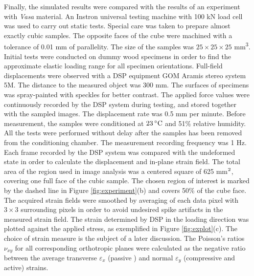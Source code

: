 \documentclass[3p]{elsarticle}
\begin{document}
Finally, the simulated results were compared with the results of an experiment
with \textit{Vasa} material.
An Instron universal testing machine with 100 kN load cell was used to carry out static tests. 
Special care was taken to prepare almost exactly cubic samples. The opposite faces of the cube were machined with a tolerance of 0.01 mm  of parallelity. 
The size of the samples was  $25\times25\times25$ mm\textsuperscript{3}.  
Initial tests were conducted on dummy wood specimens in order to find the approximate elastic loading range for all specimen orientations.
Full-field displacements were observed with a DSP equipment GOM Aramis stereo system 5M.
The distance to the measured object was 300 mm. The surfaces of specimens was spray-painted with speckles for better contrast. The applied force values were continuously recorded by the DSP system during testing, and stored together with the sampled images. The displacement rate was 0.5 mm per minute. 
Before measurement, the samples were conditioned at $23\,^{\circ}{\rm C}$ and 51\% relative humidity.
All the tests were performed without delay after the samples has been  removed from the conditioning chamber. The measurement recording frequency was 1 Hz. 
Each frame recorded by the DSP system was compared with the undeformed state in order to calculate the displacement and in-plane strain field. 
The total area of the region used in image analysis was a centered square
of 625 mm$\textsuperscript{2}$, covering one full face of the cubic sample.
The chosen region of interest is marked by the dashed line in Figure
\ref{fig:experiment}(b) and covers 50\% of the cube face. The acquired
strain fields were smoothed by averaging of each data pixel with $3\times3$ surrounding pixels in order to avoid 
undesired spike artifacts in the measured strain field.
The strain determined by DSP in the loading direction was plotted against the
applied stress, as exemplified in Figure \ref{fig:explot}(c). The choice of strain measure
is the subject of a later discussion.
The Poisson's ratios $\nu_{xy}$ for all corresponding orthotropic planes were
calculated as the negative ratio between the average transverse
$\varepsilon_{x}$ (passive ) and normal $\varepsilon_{y}$ (compressive and
active) strains.
\end{document}
